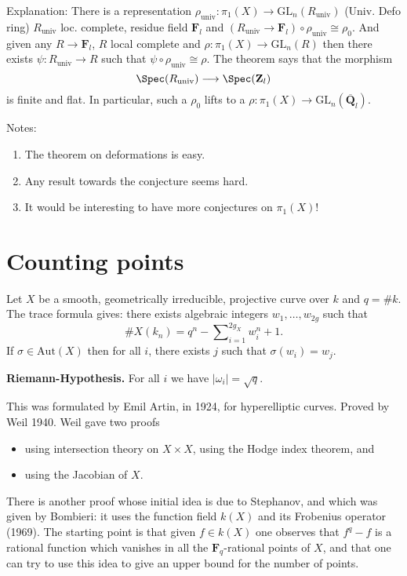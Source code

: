 \noindent
Explanation: There is a representation $\rho_{\text{univ}}:
\pi_1(X)\to \text{GL}_n(R_{\text{univ}})$ (Univ. Defo ring)
$R_{\text{univ}}$ loc.
complete, residue field $\mathbf{F}_l$ and $(R_{\text{univ}}\to
\mathbf{F}_l)\circ\rho_{\text{univ}}\cong\rho_0$.
And given any $R\to \mathbf{F}_l$, $R$ local complete and
$\rho : \pi_1(X)\to \text{GL}_n(R)$ then there exists
$\psi : R_{\text{univ}}\to R$ such that
$\psi\circ\rho_{\text{univ}}\cong \rho$. The theorem says that the morphism
$$
\Spec(R_{\text{univ}})
\longrightarrow
\Spec(\mathbf{Z}_l)
$$
is finite and flat. In particular, such a $\rho_0$
lifts to a $\rho : \pi_1(X) \to \text{GL}_n(\overline{\mathbf{Q}}_l)$.

\medskip\noindent
Notes:
\begin{enumerate}
\item The theorem on deformations is easy.
\item Any result towards the conjecture seems hard.
\item It would be interesting to have more conjectures on $\pi_1(X)$!
\end{enumerate}




\section{Counting points}
\label{section-counting}

\noindent
Let $X$ be a smooth, geometrically irreducible,
projective curve over $k$ and $q = \# k$. The trace formula gives:
there exists algebraic integers $w_1, \ldots, w_{2g}$ such that
$$
\# X(k_n) = q^n - \sum\nolimits_{i = 1}^{2g_X} w_i^n + 1.
$$
If $\sigma\in \text{Aut}(X)$ then for all $i$, there exists $j$ such that
$\sigma(w_i)=w_j$.

\medskip\noindent
{\bf Riemann-Hypothesis.} For all $i$ we have $|\omega_i| = \sqrt{q}$.

\medskip\noindent
This was formulated by Emil Artin, in 1924, for
hyperelliptic curves. Proved by Weil 1940. Weil gave two proofs
\begin{itemize}
\item using intersection theory on $X \times X$, using the
Hodge index theorem, and
\item using the Jacobian of $X$.
\end{itemize}
There is another proof whose initial idea is due to Stephanov, and
which was given by Bombieri: it uses the function field $k(X)$ and
its Frobenius operator (1969). The starting point is that given
$f\in k(X)$ one observes that $f^q - f$ is a rational function which
vanishes in all the $\mathbf{F}_q$-rational points of $X$, and that one
can try to use this idea to give an upper bound for the number of points.


